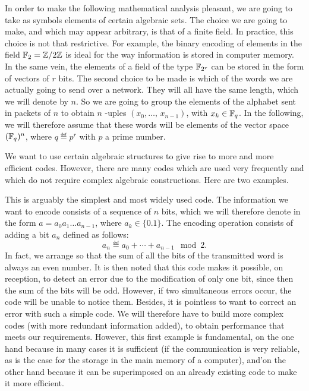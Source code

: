  
In order to make the following mathematical analysis pleasant, we are going to take as symbols elements of certain algebraic sets. The choice we are going to make, and which may appear arbitrary, is that of a finite field. In practice, this choice is not that restrictive. For example, the binary encoding of elements in the field $ \mathbb{F}_2 = \mathbb{Z}/2 \mathbb{Z} $ is ideal for the way information is stored in computer memory. In the same vein, the elements of a field of the type $ \mathbb{F}_{2^r} $ can be stored in the form of vectors of $ r $ bits. The second choice to be made is which of the words we are actually going to send over a network. They will all have the same length, which we will denote by $ n $. So we are going to group the elements of the alphabet sent in packets of $ n $ to obtain $ n $ -uples $ (x_0, \ldots, \, x_{n-1}) $, with $ x_k \in \mathbb{F}_q $. In the following, we will therefore assume that these words will be elements of the vector space $ (\mathbb{F}_q)^n $, where $ q \eqdef p^r $ with $ p $ a prime number.
 
 
We want to use certain algebraic structures to give rise to more and more efficient codes. However, there are many codes which are used very frequently and which do not require complex algebraic constructions. Here are two examples.
 
\begin{exmp}
\label{exmp-bit-parite}
 This is arguably the simplest and most widely used code. The information we want to encode consists of a sequence of $ n $ bits, which we will therefore denote in the form $ a = a_0 a_1 \ldots a_{n-1} $, where $ a_k \in \{0.1\} $. The encoding operation consists of adding a  bit $ a_n $ defined as follows:
\begin{equation*}
a_n \eqdef a_0 + \cdots + a_{n-1} \mod{2}.
\end{equation*}
In fact, we arrange so that the sum of all the bits of the transmitted word is always an even number. It is then noted that this code makes it possible, on reception, to detect an error due to the modification of only one bit, since then the sum of the bits will be odd. However, if two simultaneous errors occur, the code will be unable to notice them. Besides, it is pointless to want to correct an error with such a simple code. We will therefore have to build more complex codes (with more redundant information added), to obtain performance that meets our requirements. However, this first example is fundamental, on the one hand because in many cases it is sufficient (if the communication is very reliable, as is the case for the storage in the main memory of a computer), and'on the other hand because it can be superimposed on an already existing code to make it more efficient.
\end{exmp}
 
